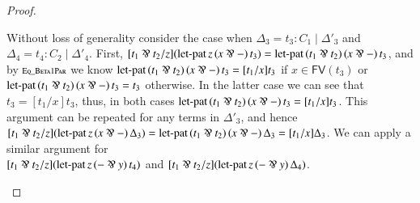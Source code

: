 \documentclass{elsarticle}
\newcommand{\FILLnt}[1]{\mathit{#1}}
\newcommand{\FILLmv}[1]{\mathit{#1}}
\newcommand{\FILLsym}[1]{#1}
\newcommand{\FILLdrulename}[1]{\textsc{#1}}
\renewcommand{\FILLdrulename}[1]{\scriptsize \textsc{#1}}
\begin{document}
\begin{proof}
\begin{report}
\begin{itemize}
Without loss of generality consider the case when
$\Delta_{{\mathrm{3}}} =  \FILLnt{t_{{\mathrm{3}}}}  \FILLsym{:}  \FILLnt{C_{{\mathrm{1}}}}  \mid  \Delta'_{{\mathrm{3}}} $ and $\Delta_{{\mathrm{4}}} =  \FILLnt{t_{{\mathrm{4}}}}  \FILLsym{:}  \FILLnt{C_{{\mathrm{2}}}}  \mid  \Delta'_{{\mathrm{4}}} $.  First,
$\FILLsym{[}   \FILLnt{t_{{\mathrm{1}}}}  \parr  \FILLnt{t_{{\mathrm{2}}}}   \FILLsym{/}  \FILLmv{z}  \FILLsym{]}   (  \mathsf{\operatorname{let-pat} }\, \FILLmv{z} \, \FILLsym{(}   \FILLmv{x}  \parr   -    \FILLsym{)} \, \FILLnt{t_{{\mathrm{3}}}}  )   \FILLsym{=}   \mathsf{\operatorname{let-pat} }\,  (  \FILLnt{t_{{\mathrm{1}}}}  \parr  \FILLnt{t_{{\mathrm{2}}}}  )  \, \FILLsym{(}   \FILLmv{x}  \parr   -    \FILLsym{)} \, \FILLnt{t_{{\mathrm{3}}}} $,
and by $\FILLdrulename{Eq\_Beta1Par}$ we know
$ \mathsf{\operatorname{let-pat} }\,  (  \FILLnt{t_{{\mathrm{1}}}}  \parr  \FILLnt{t_{{\mathrm{2}}}}  )  \, \FILLsym{(}   \FILLmv{x}  \parr   -    \FILLsym{)} \, \FILLnt{t_{{\mathrm{3}}}}   \FILLsym{=}  \FILLsym{[}  \FILLnt{t_{{\mathrm{1}}}}  \FILLsym{/}  \FILLmv{x}  \FILLsym{]}  \FILLnt{t_{{\mathrm{3}}}}$ if $ \FILLmv{x}  \in \mathsf{FV}(  \FILLnt{t_{{\mathrm{3}}}}  ) $
or $ \mathsf{\operatorname{let-pat} }\,  (  \FILLnt{t_{{\mathrm{1}}}}  \parr  \FILLnt{t_{{\mathrm{2}}}}  )  \, \FILLsym{(}   \FILLmv{x}  \parr   -    \FILLsym{)} \, \FILLnt{t_{{\mathrm{3}}}}   \FILLsym{=}  \FILLnt{t_{{\mathrm{3}}}}$ otherwise.  In the
latter case we can see that $\FILLnt{t_{{\mathrm{3}}}}  \FILLsym{=}  \FILLsym{[}  \FILLnt{t_{{\mathrm{1}}}}  \FILLsym{/}  \FILLmv{x}  \FILLsym{]}  \FILLnt{t_{{\mathrm{3}}}}$, thus, in both cases
$ \mathsf{\operatorname{let-pat} }\,  (  \FILLnt{t_{{\mathrm{1}}}}  \parr  \FILLnt{t_{{\mathrm{2}}}}  )  \, \FILLsym{(}   \FILLmv{x}  \parr   -    \FILLsym{)} \, \FILLnt{t_{{\mathrm{3}}}}   \FILLsym{=}  \FILLsym{[}  \FILLnt{t_{{\mathrm{1}}}}  \FILLsym{/}  \FILLmv{x}  \FILLsym{]}  \FILLnt{t_{{\mathrm{3}}}}$.  This argument can
be repeated for any terms in $\Delta'_{{\mathrm{3}}}$, and hence
$\FILLsym{[}   \FILLnt{t_{{\mathrm{1}}}}  \parr  \FILLnt{t_{{\mathrm{2}}}}   \FILLsym{/}  \FILLmv{z}  \FILLsym{]}  \FILLsym{(}   \mathsf{\operatorname{let-pat} }\, \FILLmv{z} \, \FILLsym{(}   \FILLmv{x}  \parr   -    \FILLsym{)} \, \Delta_{{\mathrm{3}}}   \FILLsym{)} =  \mathsf{\operatorname{let-pat} }\,  (  \FILLnt{t_{{\mathrm{1}}}}  \parr  \FILLnt{t_{{\mathrm{2}}}}  )  \, \FILLsym{(}   \FILLmv{x}  \parr   -    \FILLsym{)} \, \Delta_{{\mathrm{3}}}   \FILLsym{=}  \FILLsym{[}  \FILLnt{t_{{\mathrm{1}}}}  \FILLsym{/}  \FILLmv{x}  \FILLsym{]}  \Delta_{{\mathrm{3}}}$.
We can apply a similar argument for\\
$\FILLsym{[}   \FILLnt{t_{{\mathrm{1}}}}  \parr  \FILLnt{t_{{\mathrm{2}}}}   \FILLsym{/}  \FILLmv{z}  \FILLsym{]}   (  \mathsf{\operatorname{let-pat} }\, \FILLmv{z} \, \FILLsym{(}    -   \parr  \FILLmv{y}   \FILLsym{)} \, \FILLnt{t_{{\mathrm{4}}}}  ) $ and
$\FILLsym{[}   \FILLnt{t_{{\mathrm{1}}}}  \parr  \FILLnt{t_{{\mathrm{2}}}}   \FILLsym{/}  \FILLmv{z}  \FILLsym{]}  \FILLsym{(}   \mathsf{\operatorname{let-pat} }\, \FILLmv{z} \, \FILLsym{(}    -   \parr  \FILLmv{y}   \FILLsym{)} \, \Delta_{{\mathrm{4}}}   \FILLsym{)}$.



\end{itemize}
\end{report}
\end{proof}
\end{document}
